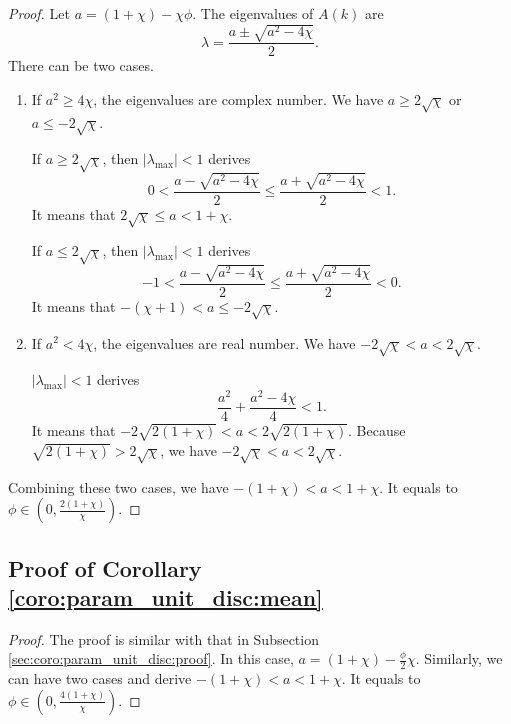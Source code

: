 \documentclass{sig-alternate}
\begin{document}
\begin{proof}
Let $ a = (1 + \chi) - \chi \phi $. 
The eigenvalues of $ A(k) $ are
\begin{equation}
\nonumber
 \lambda = \frac{ a \pm \sqrt{ a^{2} - 4 \chi } }{2} .
\end{equation}
There can be two cases.		
\begin{enumerate}
\item If $ a^{2} \geq 4 \chi $, the eigenvalues are complex number.
We have $ a \geq 2 \sqrt{\chi} $ or $ a \leq - 2 \sqrt{\chi} $.
			
If $ a \geq 2 \sqrt{\chi} $, then $ | \lambda_{\max} | < 1 $ derives 
\begin{equation}
\nonumber
0 < \frac{a-\sqrt{a^{2}-4\chi}}{2} \leq \frac{a+\sqrt{a^{2}-4\chi}}{2} < 1 .
\end{equation}
It means that $ 2 \sqrt{ \chi } \leq a < 1 + \chi $.
			
If $ a \leq 2 \sqrt{\chi} $, then $ | \lambda_{\max} | < 1 $ derives
\begin{equation}
\nonumber
-1 < \frac{a-\sqrt{a^{2}-4\chi}}{2} \leq \frac{a+\sqrt{a^{2}-4\chi}}{2} < 0 .
\end{equation}
It means that $ - (\chi+1) < a \leq - 2 \sqrt{\chi} $.
			
\item If $ a^{2} < 4 \chi $, the eigenvalues are real number.
We have $ - 2 \sqrt{\chi} < a < 2 \sqrt{\chi} $.
			
$ | \lambda_{\max} | < 1 $ derives
\begin{equation}
\nonumber
\frac{ a^{2} }{4} + \frac{ a^{2} - 4\chi }{4} < 1 .
\end{equation}
It means that $ - 2 \sqrt{ 2(1+\chi) } < a < 2 \sqrt{ 2(1+\chi) } $.
Because $ \sqrt{ 2(1+\chi) } > 2 \sqrt{ \chi } $, we have $ - 2 \sqrt{\chi} < a < 2 \sqrt{\chi} $.
\end{enumerate}
Combining these two cases, we have  $ - (1 + \chi) < a < 1 + \chi $.
It equals to $ \phi \in \left( 0 , \frac{2(1+\chi)}{\chi} \right) $.
\end{proof}		

\subsection{Proof of Corollary \ref{coro:param_unit_disc:mean}}
\label{sec:coro:param_unit_disc:proof:mean}

\begin{proof}
The proof is similar with that in Subsection \ref{sec:coro:param_unit_disc:proof}.
In this case, $ a = (1 + \chi) - \frac{ \phi }{2} \chi $.
Similarly, we can have two cases and derive
$ - (1 + \chi) < a < 1 + \chi $.
It equals to 
$
\phi \in \left( 0 , \frac{4(1+\chi)}{\chi} \right) .
$
\end{proof}
		


\end{document}
